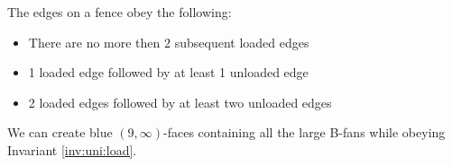 \begin{invariants}
  \label{inv:uni:load}
  \item The edges on a fence obey the following:
  \begin{itemize}
    \item There are no more then $2$ subsequent loaded edges
    \item 1 loaded edge followed by at least 1 unloaded edge
    \item 2 loaded edges followed by at least two unloaded edges
  \end{itemize}
\end{invariants}


\begin{lemma}
  \label{lm:uni:removingLargeB-fans}
  We can create blue $(9, \infty)$-faces containing all the large B-fans while obeying Invariant \ref{inv:uni:load}.
\end{lemma}


